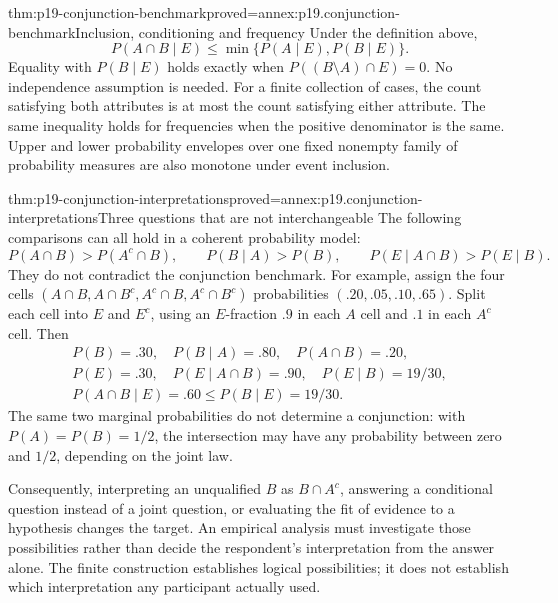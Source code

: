 \begin{hblemma}{thm:p19-conjunction-benchmark}{proved=annex:p19.conjunction-benchmark}{Inclusion, conditioning and frequency}
Under the definition above,
\[
             P(A\cap B\mid E)\leq
                    \min\{P(A\mid E),P(B\mid E)\}.
\]
Equality with \(P(B\mid E)\) holds exactly when
\(P((B\setminus A)\cap E)=0\). No independence assumption is needed.
For a finite collection of cases, the count satisfying both attributes
is at most the count satisfying either attribute. The same inequality
holds for frequencies when the positive denominator is the same.
Upper and lower probability envelopes over one fixed nonempty family
of probability measures are also monotone under event inclusion.
\end{hblemma}

\begin{hbtheorem}{thm:p19-conjunction-interpretations}{proved=annex:p19.conjunction-interpretations}{Three questions that are not interchangeable}
The following comparisons can all hold in a coherent probability model:
\[
 P(A\cap B)>P(A^c\cap B),\qquad
 P(B\mid A)>P(B),\qquad
 P(E\mid A\cap B)>P(E\mid B).
\]
They do not contradict the conjunction benchmark.
For example, assign the four cells
\((A\cap B,A\cap B^c,A^c\cap B,A^c\cap B^c)\)
probabilities \((.20,.05,.10,.65)\). Split each cell into \(E\)
and \(E^c\), using an \(E\)-fraction \(.9\) in each \(A\) cell
and \(.1\) in each \(A^c\) cell.
Then
\[
 \begin{gathered}
 P(B)=.30,\quad P(B\mid A)=.80,\quad P(A\cap B)=.20,\\
 P(E)=.30,\quad P(E\mid A\cap B)=.90,\quad P(E\mid B)=19/30,\\
 P(A\cap B\mid E)=.60\leq P(B\mid E)=19/30.
 \end{gathered}
\]
The same two marginal probabilities do not determine a conjunction:
with \(P(A)=P(B)=1/2\), the intersection may have any probability
between zero and \(1/2\), depending on the joint law.
\end{hbtheorem}

Consequently, interpreting an unqualified \(B\) as \(B\cap A^c\),
answering a conditional question instead of a joint question, or
evaluating the fit of evidence to a hypothesis changes the target.
An empirical analysis must investigate those possibilities rather
than decide the respondent's interpretation from the answer alone.
The finite construction establishes logical possibilities; it does
not establish which interpretation any participant actually used.

